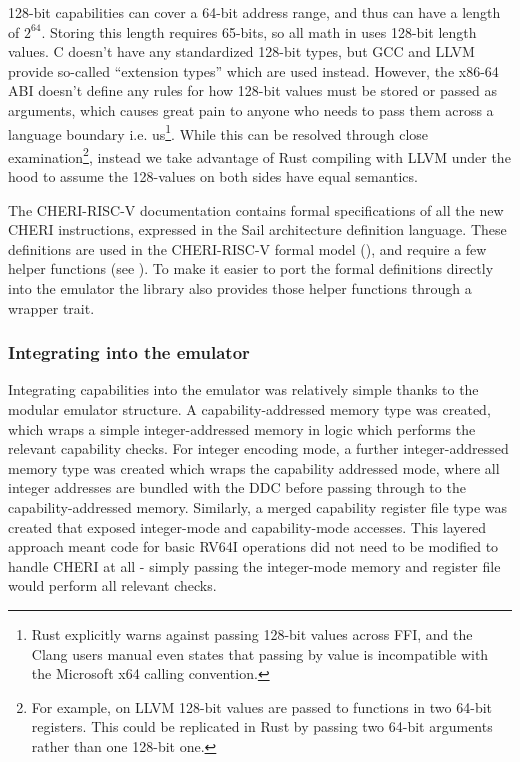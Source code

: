 128-bit capabilities can cover a 64-bit address range, and thus can have a length of $2^{64}$.
Storing this length requires 65-bits, so all math in  uses 128-bit length values.
C doesn't have any standardized 128-bit types, but GCC and LLVM provide so-called ``extension types'' which are used instead.
However, the x86-64 ABI doesn't define any rules for how 128-bit values must be stored or passed as arguments, which causes great pain to anyone who needs to pass them across a language boundary i.e. us\footnote{Rust explicitly warns against passing 128-bit values across FFI, and the Clang users manual even states that passing  by value is incompatible with the Microsoft x64 calling convention.}.
While this can be resolved through close examination\footnote{For example, on LLVM 128-bit values are passed to functions in two 64-bit registers. This could be replicated in Rust by passing two 64-bit arguments rather than one 128-bit one.}, instead we take advantage of Rust compiling with LLVM under the hood to assume the 128-values on both sides have equal semantics.


The CHERI-RISC-V documentation contains formal specifications of all the new CHERI instructions, expressed in the Sail architecture definition  language.
These definitions are used in the CHERI-RISC-V formal model (), and require a few helper functions (see ).
To make it easier to port the formal definitions directly into the emulator the  library also provides those helper functions through a wrapper trait.


\subsubsection{Integrating into the emulator}
Integrating capabilities into the emulator was relatively simple thanks to the modular emulator structure.
A capability-addressed memory type was created, which wraps a simple integer-addressed memory in logic which performs the relevant capability checks.
For integer encoding mode, a further integer-addressed memory type was created which wraps the capability addressed mode, where all integer addresses are bundled with the DDC before passing through to the capability-addressed memory.
Similarly, a merged capability register file type was created that exposed integer-mode and capability-mode accesses.
This layered approach meant code for basic RV64I operations did not need to be modified to handle CHERI at all - simply passing the integer-mode memory and register file would perform all relevant checks.

